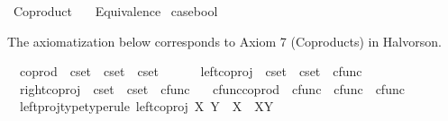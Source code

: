 %
\begin{isabellebody}%
%
%
\isadelimdocument
%
\endisadelimdocument
%
\isatagdocument
%
\isamarkuptrue%
%
\endisatagdocument
{\isafolddocument}%
%
\isadelimdocument
%
\endisadelimdocument
%
\isadelimtheory
%
\endisadelimtheory
%
\isatagtheory
{}\isamarkupfalse%
\ Coproduct\isanewline
\ \ \ Equivalence\isanewline
{}%
\endisatagtheory
{\isafoldtheory}%
%
\isadelimtheory
\isanewline
%
\endisadelimtheory
\isanewline
\isanewline
{}\isamarkupfalse%
\ case{\isacharunderscore}{\kern0pt}bool%
\begin{isamarkuptext}%
The axiomatization below corresponds to Axiom 7 (Coproducts) in Halvorson.%
\end{isamarkuptext}\isamarkuptrue%
\isamarkupfalse%
\isanewline
\ \ coprod\ {\isacharcolon}{\kern0pt}{\isacharcolon}{\kern0pt}\ {\isachardoublequoteopen}cset\ {\isasymRightarrow}\ cset\ {\isasymRightarrow}\ cset{\isachardoublequoteclose}\ {\isacharparenleft}{\kern0pt}\ {\isachardoublequoteopen}{\isasymCoprod}{\isachardoublequoteclose}\ {}{}{\isacharparenright}{\kern0pt}\ \isanewline
\ \ left{\isacharunderscore}{\kern0pt}coproj\ {\isacharcolon}{\kern0pt}{\isacharcolon}{\kern0pt}\ {\isachardoublequoteopen}cset\ {\isasymRightarrow}\ cset\ {\isasymRightarrow}\ cfunc{\isachardoublequoteclose}\ \isanewline
\ \ right{\isacharunderscore}{\kern0pt}coproj\ {\isacharcolon}{\kern0pt}{\isacharcolon}{\kern0pt}\ {\isachardoublequoteopen}cset\ {\isasymRightarrow}\ cset\ {\isasymRightarrow}\ cfunc{\isachardoublequoteclose}\ \isanewline
\ \ cfunc{\isacharunderscore}{\kern0pt}coprod\ {\isacharcolon}{\kern0pt}{\isacharcolon}{\kern0pt}\ {\isachardoublequoteopen}cfunc\ {\isasymRightarrow}\ cfunc\ {\isasymRightarrow}\ cfunc{\isachardoublequoteclose}\ {\isacharparenleft}{\kern0pt}\ {\isachardoublequoteopen}{\isasymamalg}{\isachardoublequoteclose}\ {}{}{\isacharparenright}{\kern0pt}\isanewline
{}\isanewline
\ \ left{\isacharunderscore}{\kern0pt}proj{\isacharunderscore}{\kern0pt}type{\isacharbrackleft}{\kern0pt}type{\isacharunderscore}{\kern0pt}rule{\isacharbrackright}{\kern0pt}{\isacharcolon}{\kern0pt}\ {\isachardoublequoteopen}left{\isacharunderscore}{\kern0pt}coproj\ X\ Y\ {\isacharcolon}{\kern0pt}\ X\ {\isasymrightarrow}\ X{\isasymCoprod}Y{\isachardoublequoteclose}\ \isanewline

\end{isabellebody}
